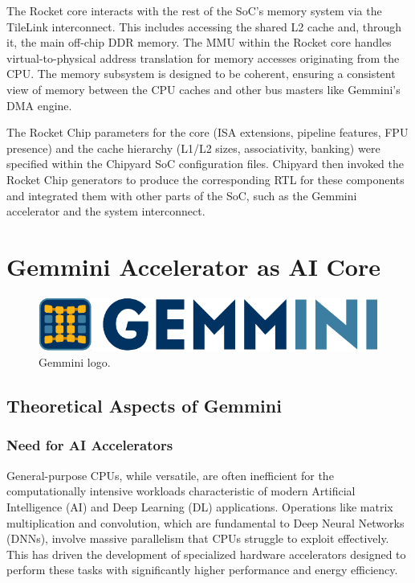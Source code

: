 The Rocket core interacts with the rest of the SoC's memory system via the TileLink interconnect. This includes accessing the shared L2 cache and, through it, the main off-chip DDR memory. The MMU within the Rocket core handles virtual-to-physical address translation for memory accesses originating from the CPU. The memory subsystem is designed to be coherent, ensuring a consistent view of memory between the CPU caches and other bus masters like Gemmini's DMA engine.

The Rocket Chip parameters for the core (ISA extensions, pipeline features, FPU presence) and the cache hierarchy (L1/L2 sizes, associativity, banking) were specified within the Chipyard SoC configuration files. Chipyard then invoked the Rocket Chip generators to produce the corresponding RTL for these components and integrated them with other parts of the SoC, such as the Gemmini accelerator and the system interconnect.

\section{Gemmini Accelerator as AI Core}
\label{sec:gemmini_ai_core}

\begin{figure}[htbp]
    \centering
    \includegraphics[width=0.75\linewidth]{Images/04_Gemmini_Logo.pdf}
    \caption{Gemmini logo.}
    \label{fig:gemmini_logo}
\end{figure}

\subsection{Theoretical Aspects of Gemmini}
\label{sec:gemmini_theoretical}
\subsubsection{Need for AI Accelerators}
General-purpose CPUs, while versatile, are often inefficient for the computationally intensive workloads characteristic of modern Artificial Intelligence (AI) and Deep Learning (DL) applications. Operations like matrix multiplication and convolution, which are fundamental to Deep Neural Networks (DNNs), involve massive parallelism that CPUs struggle to exploit effectively. This has driven the development of specialized hardware accelerators designed to perform these tasks with significantly higher performance and energy efficiency.

